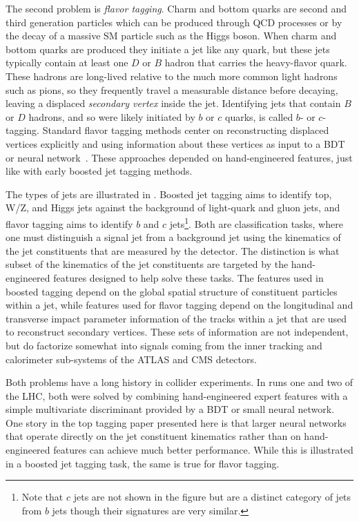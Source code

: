 The second problem is \textit{flavor tagging}.
Charm and bottom quarks are second and third generation particles which can be produced through QCD processes or by the decay of a massive SM particle such as the Higgs boson.
When charm and bottom quarks are produced they initiate a jet like any quark, but these jets typically contain at least one $D$ or $B$ hadron that carries the heavy-flavor quark.
These hadrons are long-lived relative to the much more common light hadrons such as pions, so they frequently travel a measurable distance before decaying, leaving a displaced \textit{secondary vertex} inside the jet.
Identifying jets that contain $B$ or $D$ hadrons, and so were likely initiated by $b$ or $c$ quarks, is called $b$- or $c$-tagging.
Standard flavor tagging methods center on reconstructing displaced vertices explicitly and using information about these vertices as input to a BDT or neural network~\cite{ATLAS:2016gsw}.
These approaches depended on hand-engineered features, just like with early boosted jet tagging methods.

The types of jets are illustrated in .
Boosted jet tagging aims to identify top, W/Z, and Higgs jets against the background of light-quark and gluon jets, and flavor tagging aims to identify $b$ and $c$ jets\footnote{Note that $c$ jets are not shown in the figure but are a distinct category of jets from $b$ jets though their signatures are very similar.}.
Both are classification tasks, where one must distinguish a signal jet from a background jet using the kinematics of the jet constituents that are measured by the detector.
The distinction is what subset of the kinematics of the jet constituents are targeted by the hand-engineered features designed to help solve these tasks.
The features used in boosted tagging depend on the global spatial structure of constituent particles within a jet, while features used for flavor tagging depend on the longitudinal and transverse impact parameter information of the tracks within a jet that are used to reconstruct secondary vertices.
These sets of information are not independent, but do factorize somewhat into signals coming from the inner tracking and calorimeter sub-systems of the ATLAS and CMS detectors.

Both problems have a long history in collider experiments.
In runs one and two of the LHC, both were solved by combining hand-engineered expert features with a simple multivariate discriminant provided by a BDT or small neural network.
One story in the top tagging paper presented here is that larger neural networks that operate directly on the jet constituent kinematics rather than on hand-engineered features can achieve much better performance.
While this is illustrated in a boosted jet tagging task, the same is true for flavor tagging.


